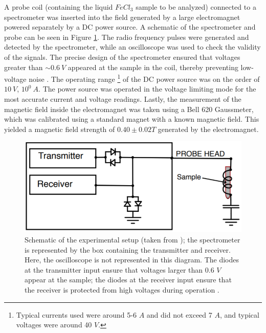 \documentclass[a4paper, 12pt]{article}  %
\begin{document}
 A probe coil (containing the liquid $FeCl_3$ sample to be analyzed) connected to a spectrometer was inserted into the field generated by a large electromagnet powered separately by a DC power source. A schematic of the spectrometer and probe can be seen in Figure \ref{fig:schematic}. The radio frequency pulses were generated and detected by the spectrometer, while an oscilloscope was used to check the validity of the signals. The precise design of the spectrometer ensured that voltages greater than $\sim 0.6 \ V$ appeared at the sample in the coil, thereby preventing low-voltage noise \cite{Lab Manual}. The operating range \footnote{Typical currents used were around 5-6 $A$ and did not exceed 7 $A$, and typical voltages were around 40 $V$.} of the DC power source was on the order of  $10 \ V$, $10^0 \ A$. The power source was operated in the voltage limiting mode for the most accurate current and voltage readings. Lastly, the measurement of the magnetic field inside the electromagnet was taken using a Bell 620 Gaussmeter, which was calibrated using a standard magnet with a known magnetic field. This yielded a magnetic field strength of $0.40 \pm 0.02 T$ generated by the electromagnet. 
 
 \begin{figure}[htb]
     \centering
     \includegraphics[scale=0.75]{schematic.PNG}
     \caption{Schematic of the experimental setup (taken from \cite{Lab Manual}); the spectrometer is represented by the box containing the transmitter and receiver. Here, the oscilloscope is not represented in this diagram. The diodes at the transmitter input ensure that voltages larger than 0.6 $V$ appear at the sample; the diodes at the receiver input ensure that the receiver is protected from high voltages during operation \cite{Lab Manual}.}
     \label{fig:schematic}
 \end{figure}

\end{document}
